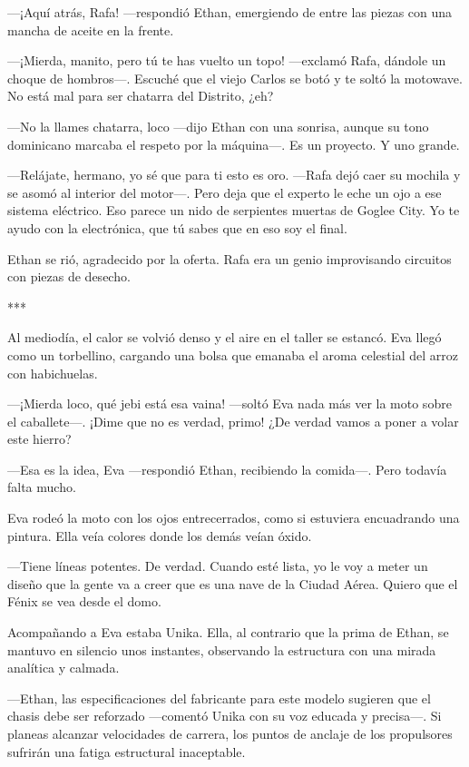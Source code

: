 \documentclass[11pt,twoside]{book}
\begin{document}
---¡Aquí atrás, Rafa! ---respondió Ethan, emergiendo de entre las piezas con una mancha de aceite en la frente.

---¡Mierda, manito, pero tú te has vuelto un topo! ---exclamó Rafa, dándole un choque de hombros---. Escuché que el viejo Carlos se botó y te soltó la motowave. No está mal para ser chatarra del Distrito, ¿eh?

---No la llames chatarra, loco ---dijo Ethan con una sonrisa, aunque su tono dominicano marcaba el respeto por la máquina---. Es un proyecto. Y uno grande.

---Relájate, hermano, yo sé que para ti esto es oro. ---Rafa dejó caer su mochila y se asomó al interior del motor---. Pero deja que el experto le eche un ojo a ese sistema eléctrico. Eso parece un nido de serpientes muertas de Goglee City. Yo te ayudo con la electrónica, que tú sabes que en eso soy el final.

Ethan se rió, agradecido por la oferta. Rafa era un genio improvisando circuitos con piezas de desecho.

\bigskip
\begin{center}***\end{center}
\bigskip

Al mediodía, el calor se volvió denso y el aire en el taller se estancó. Eva llegó como un torbellino, cargando una bolsa que emanaba el aroma celestial del arroz con habichuelas.

---¡Mierda loco, qué jebi está esa vaina! ---soltó Eva nada más ver la moto sobre el caballete---. ¡Dime que no es verdad, primo! ¿De verdad vamos a poner a volar este hierro?

---Esa es la idea, Eva ---respondió Ethan, recibiendo la comida---. Pero todavía falta mucho.

Eva rodeó la moto con los ojos entrecerrados, como si estuviera encuadrando una pintura. Ella veía colores donde los demás veían óxido.

---Tiene líneas potentes. De verdad. Cuando esté lista, yo le voy a meter un diseño que la gente va a creer que es una nave de la Ciudad Aérea. Quiero que el Fénix se vea desde el domo.

Acompañando a Eva estaba Unika. Ella, al contrario que la prima de Ethan, se mantuvo en silencio unos instantes, observando la estructura con una mirada analítica y calmada.

---Ethan, las especificaciones del fabricante para este modelo sugieren que el chasis debe ser reforzado ---comentó Unika con su voz educada y precisa---. Si planeas alcanzar velocidades de carrera, los puntos de anclaje de los propulsores sufrirán una fatiga estructural inaceptable.
\end{document}
